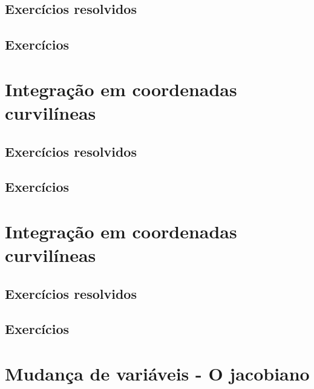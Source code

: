 \subsection*{Exercícios resolvidos}
\construirExeresol

\subsection*{Exercícios}
\construirExer

\section{Integração em coordenadas curvilíneas}

\subsection*{Exercícios resolvidos}
\construirExeresol

\subsection*{Exercícios}
\construirExer


\section{Integração em coordenadas curvilíneas}

\subsection*{Exercícios resolvidos}
\construirExeresol

\subsection*{Exercícios}
\construirExer


\section{Mudança de variáveis - O jacobiano}

